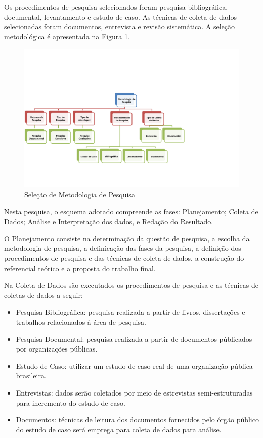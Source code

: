 Os procedimentos de pesquisa selecionados foram pesquisa bibliográfica,
documental, levantamento e estudo de caso. As técnicas de coleta de dados selecionadas foram
documentos, entrevista e revisão sistemática. A seleção
metodológica é apresentada na Figura 1.

	\begin{figure}[h]
		\centering
		\label{fig01}
			\includegraphics[scale=0.7]{figuras/metodologiapesquisa.png}
		\caption{Seleção de Metodologia de Pesquisa}
	\end{figure}

Nesta pesquisa, o esquema adotado compreende as fases: Planejamento; Coleta
de Dados; Análise e Interpretação dos dados, e Redação do Resultado. 

O Planejamento consiste na determinação da questão de pesquisa, a escolha da metodologia de pesquisa, a definicação das fases da pesquisa,  a definição dos procedimentos de pesquisa e das técnicas de coleta de dados, a construção do referencial teórico e a proposta do trabalho final.


Na Coleta de Dados são executados os procedimentos de pesquisa e as técnicas de coletas de dados a seguir:

\begin{itemize}
\item Pesquisa Bibliográfica: pesquisa realizada a partir de livros, dissertações e trabalhos relacionados à área de pesquisa.
\item Pesquisa Documental: pesquisa realizada a partir de documentos públicados por organizações públicas.
\item Estudo de Caso: utilizar um estudo de caso real de uma organização pública brasileira.
\item Entrevistas: dados serão coletados por meio de estrevistas semi-estruturadas para incremento do estudo de caso.
\item Documentos: técnicas de leitura dos documentos fornecidos pelo órgão público do estudo de caso será emprega para coleta de dados para análise.
\end{itemize}

